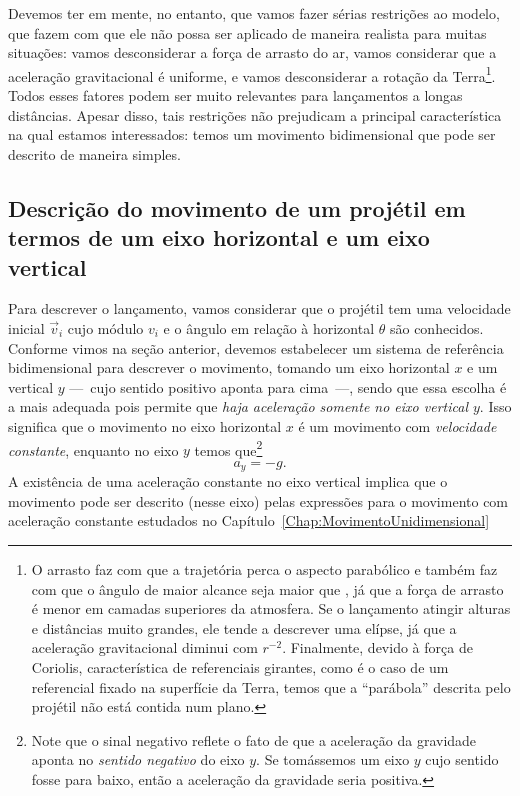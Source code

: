 Devemos ter em mente, no entanto, que vamos fazer sérias restrições ao modelo, que fazem com que ele não possa ser aplicado de maneira realista para muitas situações: vamos desconsiderar a força de arrasto do ar, vamos considerar que a aceleração gravitacional é uniforme, e vamos desconsiderar a rotação da Terra\footnote[][-2.5cm]{O arrasto faz com que a trajetória perca o aspecto parabólico e também faz com que o ângulo de maior alcance seja maior que , já que a força de arrasto é menor em camadas superiores da atmosfera. Se o lançamento atingir alturas e distâncias muito grandes, ele tende a descrever uma elípse, já que a aceleração gravitacional diminui com $r^{-2}$. Finalmente, devido à força de Coriolis, característica de referenciais girantes, como é o caso de um referencial fixado na superfície da Terra, temos que a ``parábola'' descrita pelo projétil não está contida num plano.}. Todos esses fatores podem ser muito relevantes para lançamentos a longas distâncias. Apesar disso, tais restrições não prejudicam a principal característica na qual estamos interessados: temos um movimento bidimensional que pode ser descrito de maneira simples.

\subsection{Descrição do movimento de um projétil em termos de um eixo horizontal e um eixo vertical}

Para descrever o lançamento, vamos considerar que o projétil tem uma velocidade inicial $\vec{v}_i$ cujo módulo $v_i$ e o ângulo em relação à horizontal $\theta$ são conhecidos. Conforme vimos na seção anterior, devemos estabelecer um sistema de referência bidimensional para descrever o movimento, tomando um eixo horizontal $x$ e um vertical $y$ ---~cujo sentido positivo aponta para cima~---, sendo que essa escolha é a mais adequada pois permite que \emph{haja aceleração somente no eixo vertical $y$}. Isso significa que o movimento no eixo horizontal $x$ é um movimento com \emph{velocidade constante}, enquanto no eixo $y$ temos que\footnote{Note que o sinal negativo reflete o fato de que a aceleração da gravidade aponta no \emph{sentido negativo} do eixo $y$. Se tomássemos um eixo $y$ cujo sentido fosse para baixo, então a aceleração da gravidade seria positiva.}
\begin{equation}
	a_y = -g.
\end{equation}
%
A existência de uma aceleração constante no eixo vertical implica que o movimento pode ser descrito (nesse eixo) pelas expressões para o movimento com aceleração constante estudados no Capítulo~\ref{Chap:MovimentoUnidimensional}

